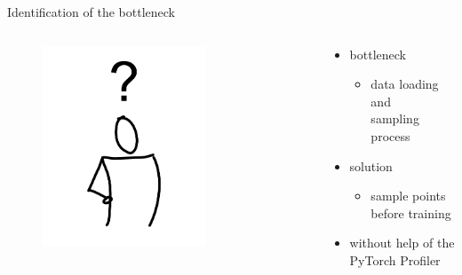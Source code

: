 \documentclass[compress,aspectratio=169]{beamer}
\begin{document}
\begin{frame}{Identification of the bottleneck}

\begin{columns}
        \begin{column}{0.5\textwidth}
            \centering
            \vspace{-1em}
            \begin{figure}
            \includegraphics[width=0.7\textwidth]{../../data/icon_question}
            \end{figure}
        \end{column}
        \begin{column}{0.5\textwidth}
            \begin{itemize}
                \item bottleneck
                \begin{itemize}
                    \item data loading and \\sampling process
                \end{itemize}
                \item solution
                    \begin{itemize}
                        \item sample points before training
                    \end{itemize}
                \vspace{2em}
                \hline
                \vspace{2em}
                \item without help of the PyTorch Profiler
            \end{itemize}
        \end{column}
    \end{columns}

\end{frame}
\end{document}
